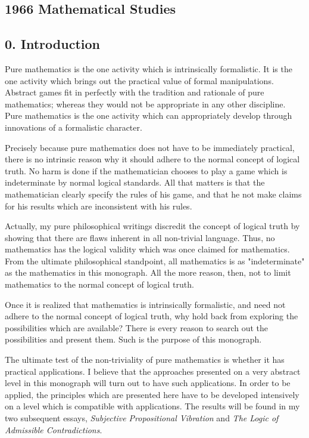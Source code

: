 \documentclass[10pt,twoside]{memoir}
\newcommand{\essaytitle}[1]{
	\emph{#1}}
\begin{document}
\begin{enumerate}
{\begin{enumerate}
\chapter{1966 Mathematical Studies}

\section*{0. Introduction}

Pure mathematics is the one activity which is intrinsically formalistic. It 
is the one activity which brings out the practical value of formal 
manipulations. Abstract games fit in perfectly with the tradition and 
rationale of pure mathematics; whereas they would not be appropriate in 
any other discipline. Pure mathematics is the one activity which can 
appropriately develop through innovations of a formalistic character. 

Precisely because pure mathematics does not have to be immediately 
practical, there is no intrinsic reason why it should adhere to the normal 
concept of logical truth. No harm is done if the mathematician chooses to 
play a game which is indeterminate by normal logical standards. All that 
matters is that the mathematician clearly specify the rules of his game, and 
that he not make claims for his results which are inconsistent with his rules. 

Actually, my pure philosophical writings discredit the concept of 
logical truth by showing that there are flaws inherent in all non-trivial 
language. Thus, no mathematics has the logical validity which was once 
claimed for mathematics. From the ultimate philosophical standpoint, all 
mathematics is as "indeterminate" as the mathematics in this monograph. 
All the more reason, then, not to limit mathematics to the normal concept 
of logical truth. 

Once it is realized that mathematics is intrinsically formalistic, and need 
not adhere to the normal concept of logical truth, why hold back from 
exploring the possibilities which are available? There is every reason to 
search out the possibilities and present them. Such is the purpose of this 
monograph. 

The ultimate test of the non-triviality of pure mathematics is whether it 
has practical applications. I believe that the approaches presented on a very 
abstract level in this monograph will turn out to have such applications. In 
order to be applied, the principles which are presented here have to be 
developed intensively on a level which is compatible with applications. The 
results will be found in my two subsequent essays, \essaytitle{Subjective Propositional 
Vibration} and \essaytitle{The Logic of Admissible Contradictions}.


\end{enumerate}}
\end{enumerate}
\end{document}
